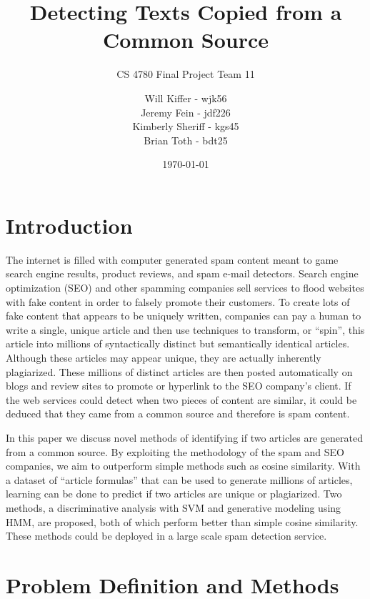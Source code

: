 \documentclass[11pt,letterpaper,oneside, titlepage]{scrartcl}
\begin{document}
\title{Detecting Texts Copied from a Common Source}
\subtitle{CS 4780 Final Project Team 11}
\date{\today}
\author{Will Kiffer - wjk56\\Jeremy Fein - jdf226\\Kimberly Sheriff - kgs45\\Brian Toth - bdt25}
\maketitle


\tableofcontents
\clearpage

\section{Introduction}

The internet is filled with computer generated spam content meant to game search engine results, product reviews, and spam e-mail detectors. Search engine optimization (SEO) and other spamming companies sell services to flood websites with fake content in order to falsely promote their customers. To create lots of fake content that appears to be uniquely written, companies can pay a human to write a single, unique article and then use techniques to transform, or “spin”, this article into millions of syntactically distinct but semantically identical articles. Although these articles may appear unique, they are actually inherently plagiarized. These millions of distinct articles are then posted automatically on blogs and review sites to promote or hyperlink to the SEO company's client. If the web services could detect when two pieces of content are similar, it could be deduced that they came from a common source and therefore is spam content.

In this paper we discuss novel methods of identifying if two articles are generated from a common source. By exploiting the methodology of the spam and SEO companies, we aim to outperform simple methods such as cosine similarity. With a dataset of “article formulas” that can be used to generate millions of articles, learning can be done to predict if two articles are unique or plagiarized. Two methods, a discriminative analysis with SVM and generative modeling using HMM, are proposed, both of which perform better than simple cosine similarity. These methods could be deployed in a large scale spam detection service.

\section{Problem Definition and Methods}
\end{document}
